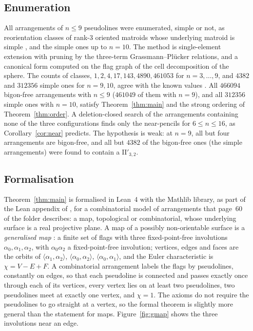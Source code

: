 \documentclass[11pt,a4paper]{amsart}
\theoremstyle{definition}
\theoremstyle{remark}
\newcommand{\IIp}{\mathrm{II}'_{3,2}}
\begin{document}
\subsection*{Enumeration}
All arrangements of $n \le 9$ pseudolines were enumerated, simple or not, as reorientation classes of rank-$3$ oriented matroids whose underlying matroid is simple \cite{bjorner1999}, and the simple ones up to $n = 10$. The method is single-element extension with pruning by the three-term Grassmann--Plücker relations, and a canonical form computed on the flag graph of the cell decomposition of the sphere. The counts of classes, $1, 2, 4, 17, 143, 4890, 461053$ for $n = 3, \dots, 9$, and $4382$ and $312356$ simple ones for $n = 9, 10$, agree with the known values \cite{finschifukuda2003}. All $466094$ bigon-free arrangements with $n \le 9$ ($461049$ of them with $n = 9$), and all $312356$ simple ones with $n = 10$, satisfy Theorem~\ref{thm:main} and the strong ordering of Theorem~\ref{thm:order}. A deletion-closed search of the arrangements containing none of the three configurations finds only the near-pencils for $6 \le n \le 16$, as Corollary~\ref{cor:near} predicts. The hypothesis is weak: at $n = 9$, all but four arrangements are bigon-free, and all but $4382$ of the bigon-free ones (the simple arrangements) were found to contain a $\IIp$.

\subsection*{Formalisation}
Theorem~\ref{thm:main} is formalised in Lean~4 with the Mathlib library, as part of the Lean appendix of \cite{hua2611}, for a combinatorial model of arrangements that page~60 of the folder describes: a map, topological or combinatorial, whose underlying surface is a real projective plane. A map of a possibly non-orientable surface is a \emph{generalised map} \cite{lienhardt1994}: a finite set of flags with three fixed-point-free involutions $\alpha_0, \alpha_1, \alpha_2$, with $\alpha_0\alpha_2$ a fixed-point-free involution; vertices, edges and faces are the orbits of $\langle\alpha_1, \alpha_2\rangle$, $\langle\alpha_0, \alpha_2\rangle$, $\langle\alpha_0, \alpha_1\rangle$, and the Euler characteristic is $\chi = V - E + F$. A combinatorial arrangement labels the flags by pseudolines, constantly on edges, so that each pseudoline is connected and passes exactly once through each of its vertices, every vertex lies on at least two pseudolines, two pseudolines meet at exactly one vertex, and $\chi = 1$. The axioms do not require the pseudolines to go straight at a vertex, so the formal theorem is slightly more general than the statement for maps. Figure~\ref{fig:gmap} shows the three involutions near an edge.
\end{document}
